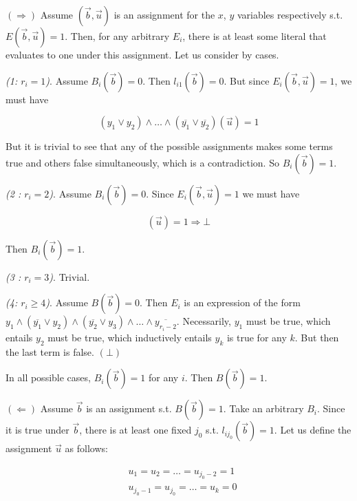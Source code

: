 \documentclass[a4paper, 12pt]{article}
\begin{document}
$(\Rightarrow)$ Assume $(\overrightarrow{b}, \overrightarrow{u})$ is an
assignment for the $x$, $y$ variables respectively s.t. $E(\overrightarrow{b},
\overrightarrow{u}) =1$. Then, for any arbitrary $E_i$, there is at least some
literal that evaluates to one under this assignment. Let us consider by cases. 

\textit{(1: $r_i = 1$)}. Assume $B_i(\overrightarrow{b})= 0$. Then $l_{i 1}(\overrightarrow{b}) = 0$. But since $E_i(\overrightarrow{b}, \overrightarrow{u}) = 1$, we must have 

\begin{equation*}
    (y_{ 1} \lor  y_{ 2}) \land  \ldots \land  (\overline{y_{ 1}} \lor  \overline{y_{ 2}})(\overrightarrow{u}) = 1
\end{equation*}

But it is trivial to see that any of the possible assignments makes some terms
true and others false simultaneously, which is a contradiction. So
$B_i(\overrightarrow{b}) = 1$.

\textit{(2 : $r_i = 2$)}. Assume $B_i(\overrightarrow{b}) = 0$. Since $E_{i}(\overrightarrow{b}, \overrightarrow{u}) = 1$ we must have 

\begin{equation*}
    [ y_{ 1} \land  y_{ 2} ](\overrightarrow{u}) = 1 \Rightarrow \bot
\end{equation*}

Then $B_i(\overrightarrow{b}) = 1$.

\textit{(3 : $r_i = 3$)}. Trivial. 

\textit{(4: $r_i \geq 4$)}. Assume $B(\overrightarrow{b}) = 0$. Then $E_i$ is
an expression of the form $y_{ 1} \land  (\overline{y_1} \lor  y_2) \land
(\overline{y_2} \lor  y_3) \land  \ldots \land  \overline{y_{r_i - 2}}$.
Necessarily, $y_1$ must be true, which entails $y_2$ must 
be true, which inductively entails $y_k$ is true for any $k$.
But then the last term is false. $( \bot )$

In all possible cases, $B_i(\overrightarrow{b}) = 1$ for any $i$. Then
$B(\overrightarrow{b}) = 1$.

$(\Leftarrow)$ Assume $\overrightarrow{b}$ is an assignment s.t.
$B(\overrightarrow{b}) = 1$. Take an arbitrary $B_i$. Since it is true under
$\overrightarrow{b}$, there is at least one fixed $j_0$ s.t.
$l_{ij_0}(\overrightarrow{b}) = 1$. Let us define the assignment $\overrightarrow{u}$
as follows:

\begin{align*}
    &u_1 = u_2 = \ldots = u_{j_0 - 2} = 1 \\
    &u_{j_0 - 1} = u_{j_0} = \ldots = u_{k} = 0 \\
\end{align*}
\end{document}
